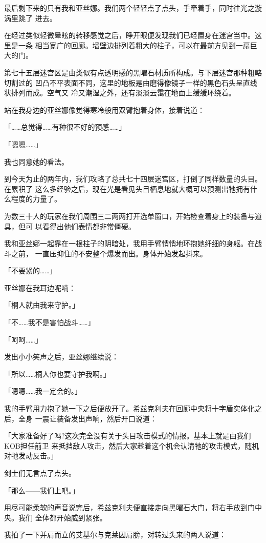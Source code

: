 \documentclass[11pt]{book}
\begin{document}
最后剩下来的只有我和亚丝娜。我们两个轻轻点了点头，手牵着手，同时往光之漩涡里跳了
进去。

在经过类似轻微晕眩的转移感觉之后，睁开眼便发现我们已经置身在迷宫当中。这里是一条
相当宽广的回廊。墙壁边排列着粗大的柱子，可以在最前方见到一扇巨大的门。

第七十五层迷宫区是由类似有点透明感的黑曜石材质所构成。与下层迷宫那种粗略切割过的
凹凸不平表面不同，这里的地板是由磨得像镜子一样的黑色石头呈直线状排列而成。空气又
冷又潮湿之外，还有淡淡云霭在地面上缓缓环绕着。

站在我身边的亚丝娜像觉得寒冷般用双臂抱着身体，接着说道：

「……总觉得……有种很不好的预感……」

「嗯嗯……」

我也同意她的看法。

到今天为止的两年内，我们攻略了总共七十四层迷宫区，打倒了同样数量的头目。在累积了
这么多经验之后，现在光是看见头目栖息地就大概可以预测出牠拥有什么程度的力量了。

为数三十人的玩家在我们周围三二两两打开选单窗口，开始检查着身上的装备与道具，但可
以看得出他们表情都非常僵硬。

我和亚丝娜一起靠在一根柱子的阴暗处，我用手臂悄悄地环抱她纤细的身躯。在战斗之前，
一直压抑住的不安整个爆发而出。身体开始发起抖来。

「不要紧的……」

亚丝娜在我耳边呢喃：

「桐人就由我来守护。」

「不……我不是害怕战斗……」

「呵呵……」

发出小小笑声之后，亚丝娜继续说：

「所以……桐人你也要守护我啊。」

「嗯嗯……我一定会的。」

我的手臂用力抱了她一下之后便放开了。希兹克利夫在回廊中央将十字盾实体化之后，全身
一震让装备发出声响，然后开口说道：

「大家准备好了吗?这次完全没有关于头目攻击模式的情报。基本上就是由我们KOB担任前卫
来抵挡敌人攻击，然后大家趁着这个机会认清牠的攻击模式，随机对牠发动反击。」

剑士们无言点了点头。

「那么——我们上吧。」

用尽可能柔软的声音说完后，希兹克利夫便直接走向黑曜石大门，将右手放到门中央。我们
全体都开始威到紧张。

我拍了一下并肩而立的艾基尔与克莱因肩膀，对转过头来的两人说道：
\end{document}
